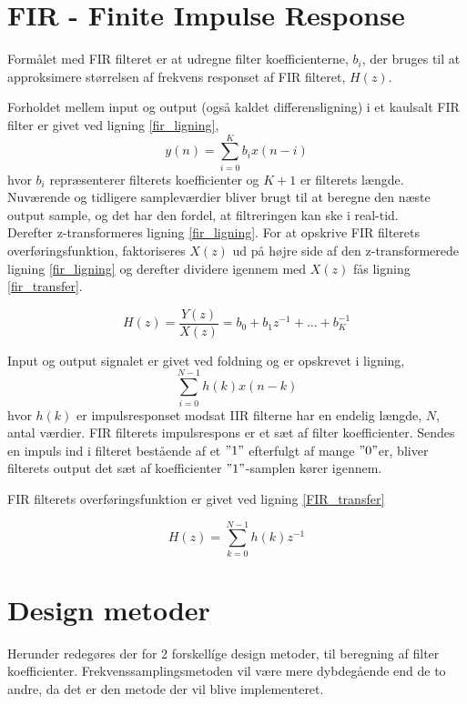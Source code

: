 \section{FIR - Finite Impulse Response}\label{sec:fir}
Formålet med FIR filteret er at udregne filter koefficienterne, $b_{i}$, der bruges til at approksimere størrelsen af frekvens responset af FIR filteret, $H(z)$.

Forholdet mellem input og output (også kaldet differensligning) i et kaulsalt FIR filter er givet ved ligning \ref{fir_ligning},
\begin {equation} 
y(n)=\sum\limits_{i=0}^{K}b_{i}x(n-i) \label{fir_ligning}
\end {equation}
hvor $b_{i}$ repræsenterer filterets koefficienter og $K+1$ er filterets længde. Nuværende og tidligere sampleværdier bliver brugt til at beregne den næste output sample, og det har den fordel, at filtreringen kan ske i real-tid.
\\
Derefter z-transformeres ligning \ref{fir_ligning}. For at opskrive FIR filterets overføringsfunktion, faktoriseres $X(z)$ ud på højre side af den z-transformerede ligning \ref{fir_ligning} og derefter dividere igennem med $X(z)$ fås ligning \ref{fir_transfer}.

\begin {equation}
H(z)=\frac{Y(z)}{X(z)}=b_{0}+b_{1}z^{-1}+...+b_{K}^{-1} \label{fir_transfer}
\end {equation}

Input og output signalet er givet ved foldning og er opskrevet i ligning,
\begin {equation} 
\sum\limits_{i=0}^{N-1} h(k)x(n-k) 
\end {equation}
hvor $h(k)$ er impulsresponset modsat IIR filterne har en endelig længde, $N$, antal værdier. FIR filterets impulsrespons er et sæt af filter koefficienter. Sendes en impuls ind i filteret bestående af et $"1"$ efterfulgt af mange $"0"$er, bliver filterets output det sæt af koefficienter $"1"$-samplen kører igennem. 


FIR filterets overføringsfunktion er givet ved ligning \ref{FIR_transfer}

\begin {equation}
H(z)=\sum\limits_{k=0}^{N-1}h(k)z^{-1} \label{FIR_transfer}
\end {equation}

\section{Design metoder} \label{sec:fir_design}
Herunder redegøres der for 2 forskellíge design metoder, til beregning af filter koefficienter.
Frekvenssamplingsmetoden vil være mere dybdegående end de to andre, da det er den metode der vil blive implementeret.
